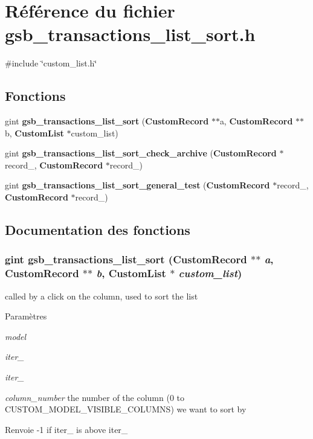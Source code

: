 \section{Référence du fichier gsb\_\-transactions\_\-list\_\-sort.h}
\label{gsb__transactions__list__sort_8h}
{\ttfamily \#include \char`\"{}custom\_\-list.h\char`\"{}}\par
\subsection*{Fonctions}
\begin{DoxyCompactItemize}
\item 
gint {\bf gsb\_\-transactions\_\-list\_\-sort} ({\bf CustomRecord} $\ast$$\ast$a, {\bf CustomRecord} $\ast$$\ast$b, {\bf CustomList} $\ast$custom\_\-list)
\item 
gint {\bf gsb\_\-transactions\_\-list\_\-sort\_\-check\_\-archive} ({\bf CustomRecord} $\ast$record\_, {\bf CustomRecord} $\ast$record\_)
\item 
gint {\bf gsb\_\-transactions\_\-list\_\-sort\_\-general\_\-test} ({\bf CustomRecord} $\ast$record\_, {\bf CustomRecord} $\ast$record\_)
\end{DoxyCompactItemize}


\subsection{Documentation des fonctions}
\subsubsection[{gsb\_\-transactions\_\-list\_\-sort}]{\setlength{\rightskip}{0pt plus 5cm}gint gsb\_\-transactions\_\-list\_\-sort ({\bf CustomRecord} $\ast$$\ast$ {\em a}, \/  {\bf CustomRecord} $\ast$$\ast$ {\em b}, \/  {\bf CustomList} $\ast$ {\em custom\_\-list})}\label{gsb__transactions__list__sort_8h_a3b2cd9609cb89b1c6f4af53433155300}
called by a click on the column, used to sort the list


\begin{DoxyParams}{Paramètres}
\item[{\em model}]\item[{\em iter\_\-1}]\item[{\em iter\_\-2}]\item[{\em column\_\-number}]the number of the column (0 to CUSTOM\_\-MODEL\_\-VISIBLE\_\-COLUMNS) we want to sort by\end{DoxyParams}
\begin{DoxyReturn}{Renvoie}
-\/1 if iter\_ is above iter\_ 
\end{DoxyReturn}


